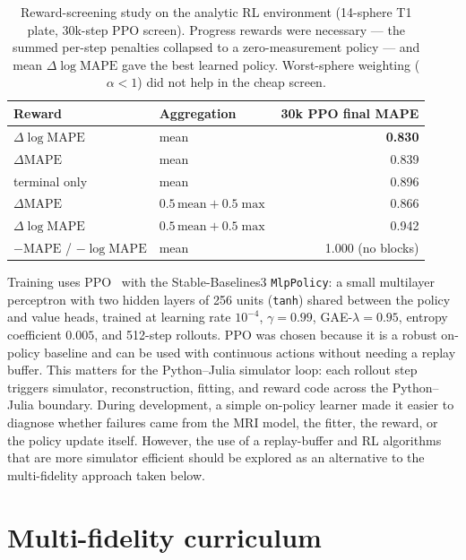 \begin{table}[!htbp]
\centering
\small
\setlength{\tabcolsep}{6pt}
\renewcommand{\arraystretch}{0.95}
\begin{tabular}{llr}
\toprule
Reward & Aggregation & 30k PPO final MAPE \\
\midrule
$\Delta\log\mathrm{MAPE}$ & mean & \textbf{0.830} \\
$\Delta\mathrm{MAPE}$ & mean & 0.839 \\
terminal only & mean & 0.896 \\
$\Delta\mathrm{MAPE}$ & $0.5\,\mathrm{mean}+0.5\max$ & 0.866 \\
$\Delta\log\mathrm{MAPE}$ & $0.5\,\mathrm{mean}+0.5\max$ & 0.942 \\
$-\mathrm{MAPE}$ / $-\log\mathrm{MAPE}$ & mean & 1.000 (no blocks) \\
\bottomrule
\end{tabular}
\caption{Reward-screening study on the analytic RL environment (14-sphere
T1 plate, 30k-step PPO screen). Progress rewards were necessary --- the
summed per-step penalties collapsed to a zero-measurement policy --- and
mean $\Delta\log\mathrm{MAPE}$ gave the best learned policy. Worst-sphere
weighting ($\alpha<1$) did not help in the cheap screen.}
\label{tab:e2-reward-screen}
\end{table}

Training uses PPO~\cite{schulman_ppo_2017} with the Stable-Baselines3
\texttt{MlpPolicy}: a small multilayer perceptron with two hidden layers of 256
units (\texttt{tanh}) shared between the policy and value heads, trained at
learning rate $10^{-4}$, $\gamma=0.99$, GAE-$\lambda=0.95$, entropy coefficient
$0.005$, and 512-step rollouts. PPO was chosen because it is a
robust on-policy baseline and can be used with continuous actions without
needing a replay buffer. This matters for the Python--Julia simulator loop:
each rollout step triggers simulator, reconstruction, fitting, and reward code
across the Python--Julia boundary. During development, a simple on-policy
learner made it easier to diagnose whether failures came from the MRI model,
the fitter, the reward, or the policy update itself. However, the use of a replay-buffer and RL algorithms that are more simulator efficient should be explored as an alternative to the multi-fidelity approach taken below.

\section{Multi-fidelity curriculum}
\label{sec:e2-mf-method}

